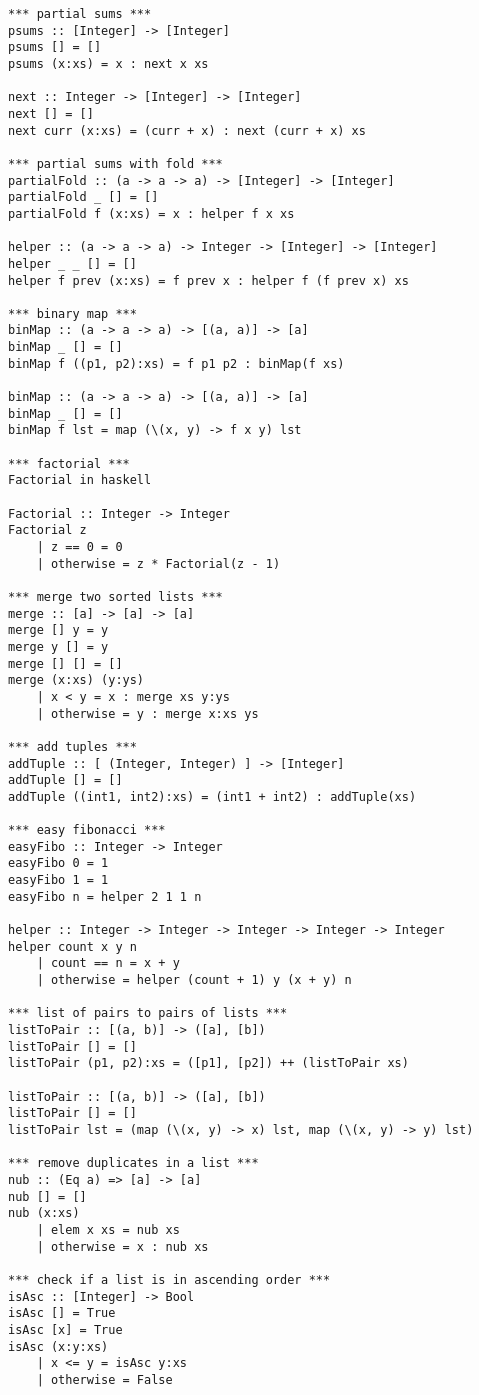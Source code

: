 \documentclass{article}
\begin{document}
    \begin{verbatim}
*** partial sums ***
psums :: [Integer] -> [Integer]
psums [] = []
psums (x:xs) = x : next x xs

next :: Integer -> [Integer] -> [Integer]
next [] = []
next curr (x:xs) = (curr + x) : next (curr + x) xs

*** partial sums with fold ***
partialFold :: (a -> a -> a) -> [Integer] -> [Integer]
partialFold _ [] = []
partialFold f (x:xs) = x : helper f x xs

helper :: (a -> a -> a) -> Integer -> [Integer] -> [Integer]
helper _ _ [] = []
helper f prev (x:xs) = f prev x : helper f (f prev x) xs

*** binary map ***
binMap :: (a -> a -> a) -> [(a, a)] -> [a]
binMap _ [] = []
binMap f ((p1, p2):xs) = f p1 p2 : binMap(f xs)

binMap :: (a -> a -> a) -> [(a, a)] -> [a]
binMap _ [] = []
binMap f lst = map (\(x, y) -> f x y) lst

*** factorial ***
Factorial in haskell

Factorial :: Integer -> Integer
Factorial z
    | z == 0 = 0
    | otherwise = z * Factorial(z - 1)

*** merge two sorted lists ***
merge :: [a] -> [a] -> [a]
merge [] y = y
merge y [] = y
merge [] [] = []
merge (x:xs) (y:ys)
    | x < y = x : merge xs y:ys
    | otherwise = y : merge x:xs ys

*** add tuples ***
addTuple :: [ (Integer, Integer) ] -> [Integer]
addTuple [] = []
addTuple ((int1, int2):xs) = (int1 + int2) : addTuple(xs)

*** easy fibonacci ***
easyFibo :: Integer -> Integer
easyFibo 0 = 1
easyFibo 1 = 1
easyFibo n = helper 2 1 1 n

helper :: Integer -> Integer -> Integer -> Integer -> Integer
helper count x y n
    | count == n = x + y
    | otherwise = helper (count + 1) y (x + y) n

*** list of pairs to pairs of lists ***
listToPair :: [(a, b)] -> ([a], [b])
listToPair [] = []
listToPair (p1, p2):xs = ([p1], [p2]) ++ (listToPair xs)

listToPair :: [(a, b)] -> ([a], [b])
listToPair [] = []
listToPair lst = (map (\(x, y) -> x) lst, map (\(x, y) -> y) lst)

*** remove duplicates in a list ***
nub :: (Eq a) => [a] -> [a]
nub [] = []
nub (x:xs)
    | elem x xs = nub xs
    | otherwise = x : nub xs

*** check if a list is in ascending order ***
isAsc :: [Integer] -> Bool
isAsc [] = True
isAsc [x] = True
isAsc (x:y:xs)
    | x <= y = isAsc y:xs
    | otherwise = False
    \end{verbatim}
\end{document}
